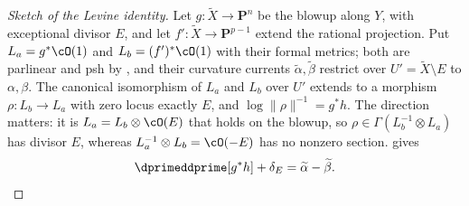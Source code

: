 \begin{proof}[Sketch of the Levine identity]
Let $g:\widetilde X\to\mathbf P^n$ be the blowup along $Y$, with
exceptional divisor $E$, and let $f':\widetilde X\to\mathbf P^{p-1}$
extend the rational projection.  Put $L_a=g^*\cO(1)$ and
$L_b=(f')^*\cO(1)$ with their formal metrics; both are parlinear and psh
by , and their curvature currents
$\widetilde\alpha,\widetilde\beta$ restrict over
$U'=\widetilde X\setminus E$ to $\alpha,\beta$.  The canonical
isomorphism of $L_a$ and $L_b$ over $U'$ extends to a morphism
$\rho:L_b\to L_a$ with zero locus exactly $E$, and
$\log\|\rho\|^{-1}=g^*h$.  The direction matters: it is
$L_a=L_b\otimes\cO(E)$ that holds on the blowup, so
$\rho\in\Gamma(L_b^{-1}\otimes L_a)$ has divisor $E$, whereas
$L_a^{-1}\otimes L_b=\cO(-E)$ has no nonzero section.   gives
\begin{equation}
\label{eq:ch17-levine-blowup}
 \dprimeddprime[g^*h]+\delta_E=\widetilde\alpha-\widetilde\beta .
\end{equation}


\end{proof}
